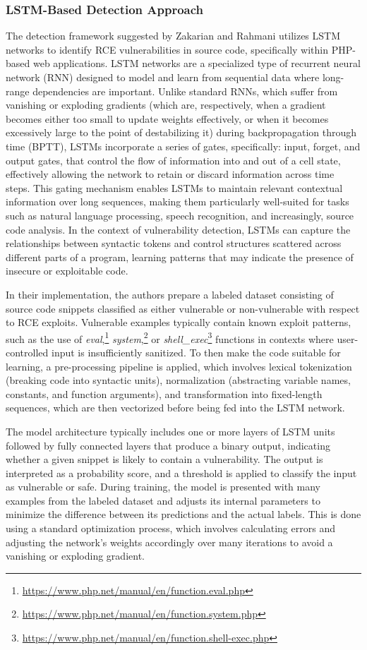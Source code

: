 \documentclass[a4paper]{usiinfbachelorproject}
\begin{document}
\subsubsection{LSTM-Based Detection Approach}
The detection framework suggested by Zakarian and Rahmani utilizes LSTM networks to identify RCE vulnerabilities in source code, specifically within PHP-based web applications. LSTM networks are a specialized type of recurrent neural network (RNN) designed to model and learn from sequential data where long-range dependencies are important. Unlike standard RNNs, which suffer from vanishing or exploding gradients (which are, respectively, when a gradient becomes either too small to update weights effectively, or when it becomes excessively large to the point of destabilizing it) during backpropagation through time (BPTT), LSTMs incorporate a series of gates, specifically: input, forget, and output gates, that control the flow of information into and out of a cell state, effectively allowing the network to retain or discard information across time steps. This gating mechanism enables LSTMs to maintain relevant contextual information over long sequences, making them particularly well-suited for tasks such as natural language processing, speech recognition, and increasingly, source code analysis. In the context of vulnerability detection, LSTMs can capture the relationships between syntactic tokens and control structures scattered across different parts of a program, learning patterns that may indicate the presence of insecure or exploitable code.

In their implementation, the authors prepare a labeled dataset consisting of source code snippets classified as either vulnerable or non-vulnerable with respect to RCE exploits. Vulnerable examples typically contain known exploit patterns, such as the use of \textit{eval},\footnote{\url{https://www.php.net/manual/en/function.eval.php}} \textit{system},\footnote{\url{https://www.php.net/manual/en/function.system.php}} or \textit{shell\_exec}\footnote{\url{https://www.php.net/manual/en/function.shell-exec.php}} functions in contexts where user-controlled input is insufficiently sanitized. To then make the code suitable for learning, a pre-processing pipeline is applied, which involves lexical tokenization (breaking code into syntactic units), normalization (abstracting variable names, constants, and function arguments), and transformation into fixed-length sequences, which are then vectorized before being fed into the LSTM network.

The model architecture typically includes one or more layers of LSTM units followed by fully connected layers that produce a binary output, indicating whether a given snippet is likely to contain a vulnerability. The output is interpreted as a probability score, and a threshold is applied to classify the input as vulnerable or safe. During training, the model is presented with many examples from the labeled dataset and adjusts its internal parameters to minimize the difference between its predictions and the actual labels. This is done using a standard optimization process, which involves calculating errors and adjusting the network’s weights accordingly over many iterations to avoid a vanishing or exploding gradient.
\end{document}
